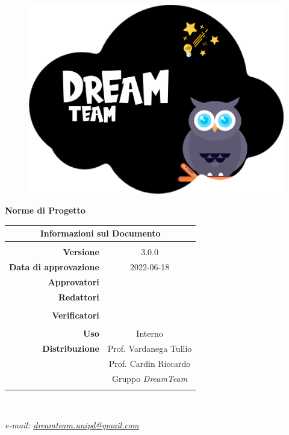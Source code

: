 
\begin{center}

\begin{figure}
\centering
\includegraphics[scale=0.05]{Contenuto/Immagini/DreamTeam.png} 
\end{figure}

{\Huge{\textbf{Norme di Progetto}}} \\ [1cm]

\begin{table}[htbp]
\centering
\begin{tabular}{r|c}
\multicolumn{2}{c}{\textbf{Informazioni sul Documento}} \\
\hline \\
\textbf{Versione} & 3.0.0 \\ \rule{0pt}{3ex}    
\textbf{Data di approvazione} & 2022-06-18  \\ \rule{0pt}{2ex} 
\textbf{Approvatori} & \MB{} \\ \rule{0pt}{3ex}      
\textbf{Redattori} & \MG{} \\ \rule{0pt}{2ex}   
& \PV{} \\ \rule{0pt}{3ex}    
\textbf{Verificatori} 
  & \GC{} \\ \rule{0pt}{2ex}
& \EP{} \\ \rule{0pt}{2ex} 
      
\textbf{Uso} & Interno \\ \rule{0pt}{3ex}    
\textbf{Distribuzione} & Prof. Vardanega Tullio \\ \rule{0pt}{2ex}   
& Prof. Cardin Riccardo \\ \rule{0pt}{2ex}   
& Gruppo \textit{DreamTeam} \\ \rule{0pt}{0.1cm}   
\end{tabular} \\ [0.5cm]
\end{table}

\textsl{ e-mail: \href{mailto:dreamteam.unipd@gmail.com}{dreamteam.unipd@gmail.com} } \\[2cm]
\end{center}
\pagebreak